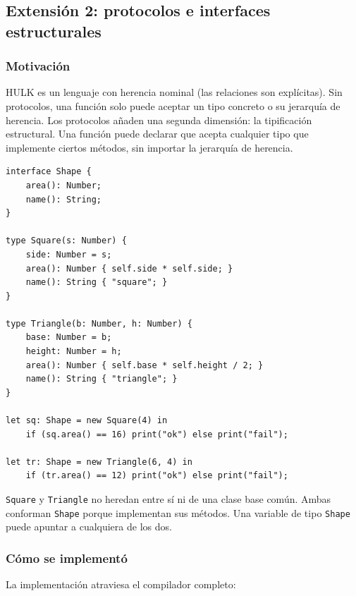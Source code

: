 \documentclass[12pt,letterpaper]{article}
\newcommand{\hulk}{\textsc{HULK}}
\newcommand{\src}[1]{\texttt{#1}}
\begin{document}
\subsection{Extensión 2: protocolos e interfaces estructurales}

\subsubsection{Motivación}

\hulk{} es un lenguaje con herencia nominal (las relaciones son explícitas). Sin protocolos, una función solo puede aceptar un tipo concreto o su jerarquía de herencia. Los protocolos añaden una segunda dimensión: la tipificación estructural. Una función puede declarar que acepta cualquier tipo que implemente ciertos métodos, sin importar la jerarquía de herencia.

\begin{lstlisting}[language=HULK,caption={Polimorfismo estructural con interfaces}]
interface Shape {
    area(): Number;
    name(): String;
}

type Square(s: Number) {
    side: Number = s;
    area(): Number { self.side * self.side; }
    name(): String { "square"; }
}

type Triangle(b: Number, h: Number) {
    base: Number = b;
    height: Number = h;
    area(): Number { self.base * self.height / 2; }
    name(): String { "triangle"; }
}

let sq: Shape = new Square(4) in
    if (sq.area() == 16) print("ok") else print("fail");

let tr: Shape = new Triangle(6, 4) in
    if (tr.area() == 12) print("ok") else print("fail");
\end{lstlisting}

\src{Square} y \src{Triangle} no heredan entre sí ni de una clase base común. Ambas conforman \src{Shape} porque implementan sus métodos. Una variable de tipo \src{Shape} puede apuntar a cualquiera de los dos.

\subsubsection{Cómo se implementó}

La implementación atraviesa el compilador completo:
\end{document}
